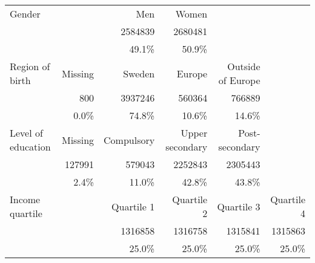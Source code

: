 \begin{tabular}{@{}l*{5}{r}@{}}
\toprule
Gender              &             & {Men}        & {Women}           &                       &                  \tabularnewline
                    &             & \num{2584839}      & \num{2680481}           &                       &                \tabularnewline
                    &             & 49.1\%         & 50.9\%              &                       &                \tabularnewline
\midrule
Region of birth     & {Missing} & {Sweden}     & {Europe}          & {Outside of Europe} &                \tabularnewline
                    & \num{800}         & \num{3937246}      & \num{560364}             & \num{766889}               &                \tabularnewline
                    & 0.0\%       & 74.8\%         & 10.6\%              & 14.6\%                &                \tabularnewline
\midrule
Level of education  & {Missing} & {Compulsory} & {Upper secondary} & {Post-secondary}    &                \tabularnewline
                    & \num{127991}     & \num{579043}        & \num{2252843}           & \num{2305443}             &                \tabularnewline
                    & 2.4\%       & 11.0\%         & 42.8\%              & 43.8\%                &                \tabularnewline
\midrule
Income quartile     &             & {Quartile 1} & {Quartile 2}      & {Quartile 3}        & {Quartile 4} \tabularnewline
                    &             & \num{1316858}      & \num{1316758}           & \num{1315841}             & \num{1315863}      \tabularnewline
                    &             & 25.0\%         & 25.0\%              & 25.0\%                & 25.0\%         \tabularnewline
\bottomrule
\end{tabular}